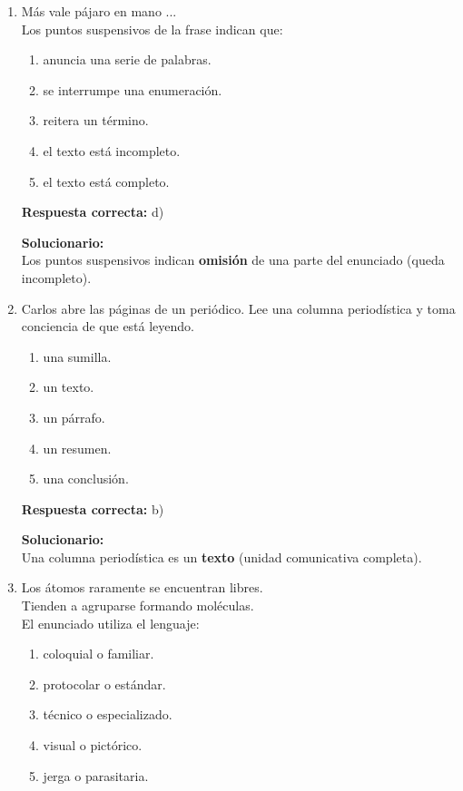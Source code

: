 \begin{enumerate}



\item  Más vale pájaro en mano ...\\
Los puntos suspensivos de la frase indican que:
\begin{enumerate}[label=\alph*)]
	\item anuncia una serie de palabras.
	\item se interrumpe una enumeración.
	\item reitera un término.
	\item el texto está incompleto.
	\item el texto está completo.
\end{enumerate}

\textbf{Respuesta correcta:} d)

\vspace{2mm}
\textbf{Solucionario:}\\
Los puntos suspensivos indican \textbf{omisión} de una parte del enunciado (queda incompleto).

\item Carlos abre las páginas de un periódico. Lee una columna periodística y toma conciencia de que está leyendo.
\begin{enumerate}[label=\alph*)]
	\item una sumilla.
	\item un texto.
	\item un párrafo.
	\item un resumen.
	\item una conclusión.
\end{enumerate}

\textbf{Respuesta correcta:} b)

\vspace{2mm}
\textbf{Solucionario:}\\
Una columna periodística es un \textbf{texto} (unidad comunicativa completa).

\item  Los átomos raramente se encuentran libres.\\
Tienden a agruparse formando moléculas.\\
El enunciado utiliza el lenguaje:
\begin{enumerate}[label=\alph*)]
	\item coloquial o familiar.
	\item protocolar o estándar.
	\item técnico o especializado.
	\item visual o pictórico.
	\item jerga o parasitaria.
\end{enumerate}


\end{enumerate}
